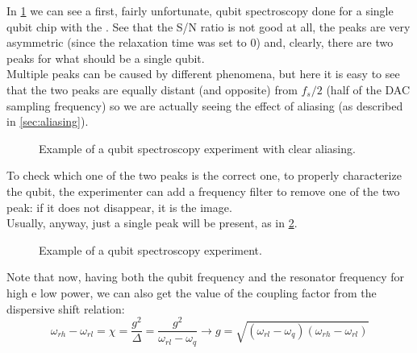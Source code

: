 In \cref{fig:qubit_spectroscopy_aliased} we can see a first, fairly unfortunate, qubit spectroscopy done for a single qubit chip with the \RFSoC.
See that the S/N ratio is not good at all, the peaks are very asymmetric (since the relaxation time was set to 0) and, clearly, there are two peaks for what should be a single qubit.\\
Multiple peaks can be caused by different phenomena, but here it is easy to see that the two peaks are equally distant (and opposite) from $f_s/2$ (half of the DAC sampling frequency) so we are actually seeing the effect of aliasing (as described in \cref{sec:aliasing}).
\begin{figure}[ht]
    \caption{Example of a qubit spectroscopy experiment with clear aliasing.}
    \label{fig:qubit_spectroscopy_aliased}
\end{figure}
To check which one of the two peaks is the correct one, to properly characterize the qubit, the experimenter can add a frequency filter to remove one of the two peak: if it does not disappear, it is the image.
\\
Usually, anyway, just a single peak will be present, as in \cref{fig:qubit_spectroscopy}.

\begin{figure}[ht]
    \caption{Example of a qubit spectroscopy experiment.}
    \label{fig:qubit_spectroscopy}
\end{figure}
Note that now, having both the qubit frequency and the resonator frequency for high e low power, we can also get the value of the coupling factor from the dispersive shift relation:
\begin{equation}
    \omega_{rh} - \omega_{rl} = \chi = \frac{g^2}{\Delta} = \frac{g^2}{\omega_{rl} - \omega_q} \rightarrow g =  \sqrt{(\omega_{rl} - \omega_q)(\omega_{rh} - \omega_{rl})}
\end{equation}

